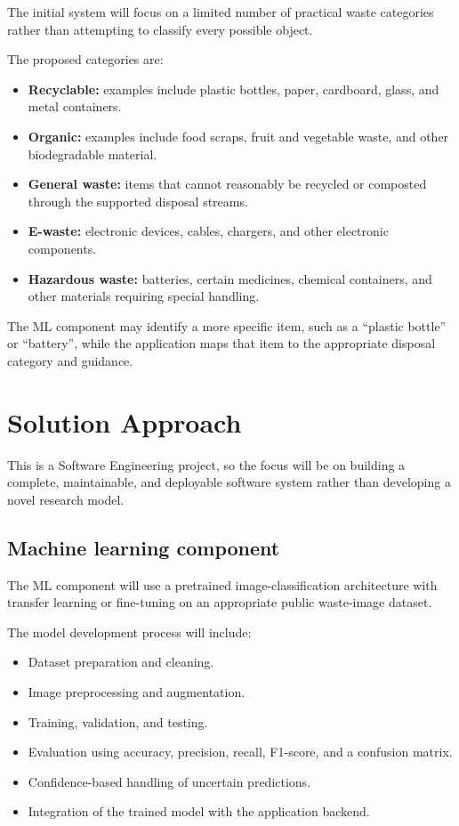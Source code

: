 \documentclass[11pt,a4paper]{article}
\begin{document}
The initial system will focus on a limited number of practical waste categories rather than attempting to classify every possible object.

The proposed categories are:

\begin{itemize}[leftmargin=0.7cm]
    \item \textbf{Recyclable:} examples include plastic bottles, paper, cardboard, glass, and metal containers.
    \item \textbf{Organic:} examples include food scraps, fruit and vegetable waste, and other biodegradable material.
    \item \textbf{General waste:} items that cannot reasonably be recycled or composted through the supported disposal streams.
    \item \textbf{E-waste:} electronic devices, cables, chargers, and other electronic components.
    \item \textbf{Hazardous waste:} batteries, certain medicines, chemical containers, and other materials requiring special handling.
\end{itemize}

The ML component may identify a more specific item, such as a ``plastic bottle'' or ``battery'', while the application maps that item to the appropriate disposal category and guidance.

\section{Solution Approach}

This is a Software Engineering project, so the focus will be on building a complete, maintainable, and deployable software system rather than developing a novel research model.

\subsection{Machine learning component}

The ML component will use a pretrained image-classification architecture with transfer learning or fine-tuning on an appropriate public waste-image dataset.

The model development process will include:

\begin{itemize}[leftmargin=0.7cm]
    \item Dataset preparation and cleaning.
    \item Image preprocessing and augmentation.
    \item Training, validation, and testing.
    \item Evaluation using accuracy, precision, recall, F1-score, and a confusion matrix.
    \item Confidence-based handling of uncertain predictions.
    \item Integration of the trained model with the application backend.
\end{itemize}
\end{document}
